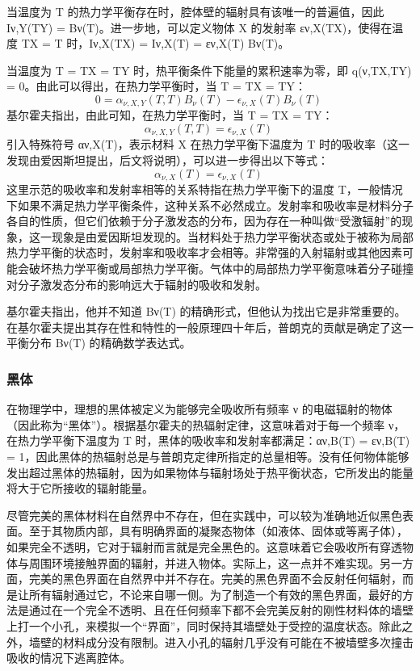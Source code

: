 当温度为 T 的热力学平衡存在时，腔体壁的辐射具有该唯一的普遍值，因此 Iν,Y(TY) = Bν(T)。进一步地，可以定义物体 X 的发射率 εν,X(TX)，使得在温度 TX = T 时，Iν,X(TX) = Iν,X(T) = εν,X(T) Bν(T)。

当温度为 T = TX = TY 时，热平衡条件下能量的累积速率为零，即 q(ν,TX,TY) = 0。由此可以得出，在热力学平衡时，当 T = TX = TY：
\[ 0 = \alpha_{\nu ,X,Y}(T,T) B_{\nu}(T) - \epsilon_{\nu ,X}(T) B_{\nu}(T)~\]
基尔霍夫指出，由此可知，在热力学平衡时，当 T = TX = TY：
\[ \alpha_{\nu ,X,Y}(T,T) = \epsilon_{\nu ,X}(T) ~\]
引入特殊符号 αν,X(T)，表示材料 X 在热力学平衡下温度为 T 时的吸收率（这一发现由爱因斯坦提出，后文将说明），可以进一步得出以下等式：
\[ \alpha_{\nu ,X}(T) = \epsilon_{\nu ,X}(T) ~\]
这里示范的吸收率和发射率相等的关系特指在热力学平衡下的温度 T，一般情况下如果不满足热力学平衡条件，这种关系不必然成立。发射率和吸收率是材料分子各自的性质，但它们依赖于分子激发态的分布，因为存在一种叫做“受激辐射”的现象，这一现象是由爱因斯坦发现的。当材料处于热力学平衡状态或处于被称为局部热力学平衡的状态时，发射率和吸收率才会相等。非常强的入射辐射或其他因素可能会破坏热力学平衡或局部热力学平衡。气体中的局部热力学平衡意味着分子碰撞对分子激发态分布的影响远大于辐射的吸收和发射。

基尔霍夫指出，他并不知道 Bν(T) 的精确形式，但他认为找出它是非常重要的。在基尔霍夫提出其存在性和特性的一般原理四十年后，普朗克的贡献是确定了这一平衡分布 Bν(T) 的精确数学表达式。
\subsubsection{黑体}
在物理学中，理想的黑体被定义为能够完全吸收所有频率 ν 的电磁辐射的物体（因此称为“黑体”）。根据基尔霍夫的热辐射定律，这意味着对于每一个频率 ν，在热力学平衡下温度为 T 时，黑体的吸收率和发射率都满足：αν,B(T) = εν,B(T) = 1，因此黑体的热辐射总是与普朗克定律所指定的总量相等。没有任何物体能够发出超过黑体的热辐射，因为如果物体与辐射场处于热平衡状态，它所发出的能量将大于它所接收的辐射能量。

尽管完美的黑体材料在自然界中不存在，但在实践中，可以较为准确地近似黑色表面。至于其物质内部，具有明确界面的凝聚态物体（如液体、固体或等离子体），如果完全不透明，它对于辐射而言就是完全黑色的。这意味着它会吸收所有穿透物体与周围环境接触界面的辐射，并进入物体。实际上，这一点并不难实现。另一方面，完美的黑色界面在自然界中并不存在。完美的黑色界面不会反射任何辐射，而是让所有辐射通过它，不论来自哪一侧。为了制造一个有效的黑色界面，最好的方法是通过在一个完全不透明、且在任何频率下都不会完美反射的刚性材料体的墙壁上打一个小孔，来模拟一个“界面”，同时保持其墙壁处于受控的温度状态。除此之外，墙壁的材料成分没有限制。进入小孔的辐射几乎没有可能在不被墙壁多次撞击吸收的情况下逃离腔体。
